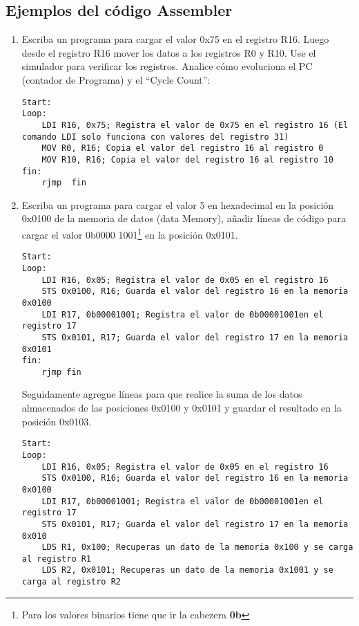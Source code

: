 \documentclass[
	12pt, %
	fleqn, %
	a4paper, %
]{LegrandOrangeBook}
\begin{document}
\subsection{Ejemplos del código Assembler}
\begin{enumerate}
\item Escriba un programa para cargar el valor 0x75 en el registro R16. Luego desde el registro R16 mover los datos a los registros R0 y R10. Use el simulador para verificar los registros. Analice cómo evoluciona el PC (contador de Programa) y el ``Cycle Count'':
\begin{lstlisting}[language={[x86masm]Assembler},frame=single,caption={Crear y mover registros},captionpos=b,numbers=none]
Start:
Loop:
	LDI R16, 0x75; Registra el valor de 0x75 en el registro 16 (El comando LDI solo funciona con valores del registro 31)
    MOV R0, R16; Copia el valor del registro 16 al registro 0
    MOV R10, R16; Copia el valor del registro 16 al registro 10
fin:   
    rjmp  fin
\end{lstlisting}
\item Escriba un programa para cargar el valor 5 en hexadecimal en la posición 0x0100 de la memoria de datos (data Memory), añadir líneas de código para cargar el valor 0b0000 1001\footnote{Para los valores binarios tiene que ir la cabezera \textbf{0b}} en la posición 0x0101. 
\begin{lstlisting}[language={[x86masm]Assembler},frame=single,caption={Acceso a la mejora SRAM},captionpos=b,numbers=none]
Start:
Loop:
	LDI R16, 0x05; Registra el valor de 0x05 en el registro 16
	STS 0x0100, R16; Guarda el valor del registro 16 en la memoria 0x0100
	LDI R17, 0b00001001; Registra el valor de 0b00001001en el registro 17
	STS 0x0101, R17; Guarda el valor del registro 17 en la memoria 0x0101
fin:
	rjmp fin
\end{lstlisting}
Seguidamente agregue líneas para que realice la suma de los datos almacenados de las posiciones 0x0100 y 0x0101 y guardar el resultado en la posición 0x0103.
\begin{lstlisting}[language={[x86masm]Assembler},frame=single,caption={Movimiento de datos en la SRAM},captionpos=b,numbers=none]
Start:
Loop:
	LDI R16, 0x05; Registra el valor de 0x05 en el registro 16
	STS 0x0100, R16; Guarda el valor del registro 16 en la memoria 0x0100
	LDI R17, 0b00001001; Registra el valor de 0b00001001en el registro 17
	STS 0x0101, R17; Guarda el valor del registro 17 en la memoria 0x010
	LDS R1, 0x100; Recuperas un dato de la memoria 0x100 y se carga al registro R1
	LDS R2, 0x0101; Recuperas un dato de la memoria 0x1001 y se carga al registro R2

\end{lstlisting}
\end{enumerate}
\end{document}
